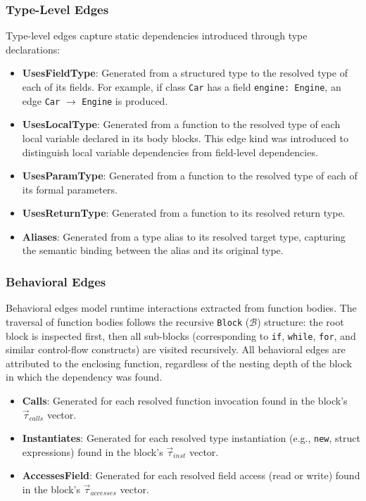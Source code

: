 \subsubsection{Type-Level Edges}
Type-level edges capture static dependencies introduced through type declarations:
\begin{itemize}
  \item \textbf{UsesFieldType}: Generated from a structured type to the resolved type of each of its fields. For example, if class \texttt{Car} has a field \texttt{engine: Engine}, an edge \texttt{Car} $\to$ \texttt{Engine} is produced.
  \item \textbf{UsesLocalType}: Generated from a function to the resolved type of each local variable declared in its body blocks. This edge kind was introduced to distinguish local variable dependencies from field-level dependencies.
  \item \textbf{UsesParamType}: Generated from a function to the resolved type of each of its formal parameters.
  \item \textbf{UsesReturnType}: Generated from a function to its resolved return type.
  \item \textbf{Aliases}: Generated from a type alias to its resolved target type, capturing the semantic binding between the alias and its original type.
\end{itemize}

\subsubsection{Behavioral Edges}
Behavioral edges model runtime interactions extracted from function bodies. The traversal of function bodies follows the recursive \texttt{Block} ($\mathcal{B}$) structure: the root block is inspected first, then all sub-blocks (corresponding to \texttt{if}, \texttt{while}, \texttt{for}, and similar control-flow constructs) are visited recursively. All behavioral edges are attributed to the enclosing function, regardless of the nesting depth of the block in which the dependency was found.

\begin{itemize}
  \item \textbf{Calls}: Generated for each resolved function invocation found in the block's $\vec{\tau}_{calls}$ vector.
  \item \textbf{Instantiates}: Generated for each resolved type instantiation (e.g., \texttt{new}, struct expressions) found in the block's $\vec{\tau}_{inst}$ vector.
  \item \textbf{AccessesField}: Generated for each resolved field access (read or write) found in the block's $\vec{\tau}_{accesses}$ vector.
\end{itemize}

